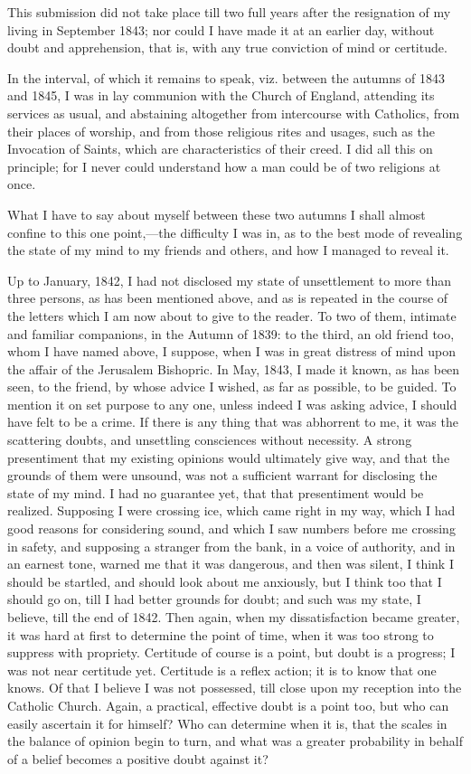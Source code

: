 This submission did not take place till two full years after the
resignation of my living in September 1843; nor could I have made it at
an earlier day, without doubt and apprehension, that is, with any true
conviction of mind or certitude.

In the interval, of which it remains to speak, viz. between the
autumns of 1843 and 1845, I was in lay communion with the Church of England, attending its services
as usual, and abstaining altogether from intercourse with Catholics,
from their places of worship, and from those religious rites and usages,
such as the Invocation of Saints, which are characteristics of their
creed. I did all this on principle; for I never could understand how a
man could be of two religions at once.

What I have to say about myself
between these two autumns I shall almost confine to this one
point,—the difficulty I was in, as to the best mode of
revealing the state of my mind to my friends and others, and how I
managed to reveal it.

Up to January, 1842, I had not disclosed my state of unsettlement to
more than three persons, as has been mentioned above, and as is
repeated in the course of the letters which I am now about to
give to the reader. To two of them, intimate and familiar
companions, in the Autumn of 1839: to the third, an old friend too, whom I have named above, I suppose,
when I was in great
distress of mind upon the affair of the Jerusalem Bishopric. In May,
1843, I made it known, as has been seen, to the
friend, by whose advice I wished, as far as possible, to be guided. To
mention it on set purpose to any one, unless indeed I was asking advice,
I should have felt to be a crime. If there is any thing that was abhorrent to me, it
was the scattering doubts, and
unsettling consciences without necessity. A strong presentiment that my
existing opinions would ultimately give way, and that the grounds of
them were unsound, was not a sufficient warrant for disclosing the state
of my mind. I had no guarantee yet, that that presentiment would be
realized. Supposing I were crossing ice, which came right in my way,
which I had good reasons for considering sound, and which I saw numbers
before me crossing in safety, and supposing a stranger from the bank, in
a voice of authority, and in an earnest tone, warned me that it was
dangerous, and then was silent, I think I should be startled, and should
look about me anxiously, but I think too that I should go
on, till I had better grounds for doubt; and such was my state, I
believe, till the end of 1842. Then again, when my dissatisfaction
became greater, it was hard at first to determine the point of time,
when it was too strong to suppress with propriety. Certitude of course
is a point, but doubt is a progress; I was not near certitude yet.
Certitude is a reflex action; it is to know that one knows. Of
that I believe I was not possessed, till close upon my reception into the Catholic
Church. Again, a practical, effective doubt is a point too, but who can
easily ascertain it for himself? Who can determine when it is, that the
scales in the balance of opinion begin to turn, and what was a greater
probability in behalf of a belief becomes a positive doubt against it?


